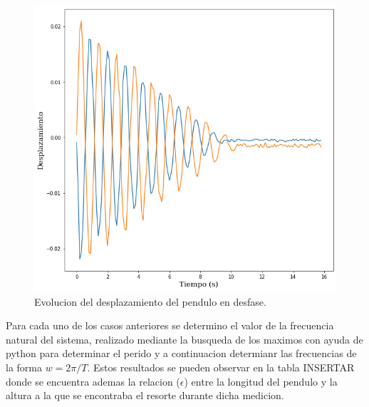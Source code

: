 \documentclass[10pt]{article}
\begin{document}
        \begin{figure}[H]
            \centering
            \includegraphics[scale = 0.3]{img/digrama_desfase.png}
            \caption{Evolucion del desplazamiento del pendulo en desfase.}
        \end{figure}
 
        Para cada uno de los casos anteriores se determino el valor de la frecuencia natural del sistema, realizado mediante la busqueda de los maximos con ayuda de python para determinar el perido y a continuacion determianr las frecuencias de la forma $ w = 2 \pi / T $. Estos resultados se pueden observar en la tabla INSERTAR donde se encuentra ademas la relacion ($ \epsilon $) entre la longitud del pendulo y la altura a la que se encontraba el resorte durante dicha medicion.
 
\end{document}

